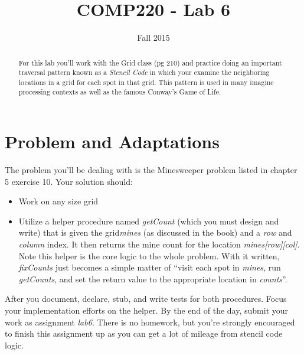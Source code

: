 \documentclass[10pt]{article}
\title{COMP220 - Lab 6}
\author{ }
\date{Fall 2015}
\begin{document}
\maketitle

\begin{abstract}
For this lab you'll work with the Grid class (pg 210) and practice doing an important traversal pattern known as a \textit{Stencil Code} in which your examine the neighboring locations in a grid for each spot in that grid. This pattern is used in many imagine processing contexts as well as the famous Conway's Game of Life. 
\end{abstract}

\section{Problem and Adaptations}

The problem you'll be dealing with is the Minesweeper problem listed in chapter 5 exercise 10. Your solution should:
\begin{itemize}
\item Work on any size grid
\item Utilize a helper procedure named \textit{getCount} (which you must design and write) that is given the grid\textit{mines} (as discussed in the book) and a \textit{row} and \textit{column} index. It then returns the mine count for the location \textit{mines[row][col]}. Note this helper is the core logic to the whole problem. With it written, \textit{fixCounts} just becomes a simple matter of ``visit each spot in \textit{mines}, run \textit{getCounts}, and set the return value to the appropriate location in \textit{counts}''.
\end{itemize}
After you document, declare, stub, and write tests for both procedures. Focus your implementation efforts on the helper. By the end of the day, submit your work as assignment \textit{lab6}. There is no homework, but you're strongly encouraged to finish this assignment up as you can get a lot of mileage from stencil code logic.

 
\end{document}
